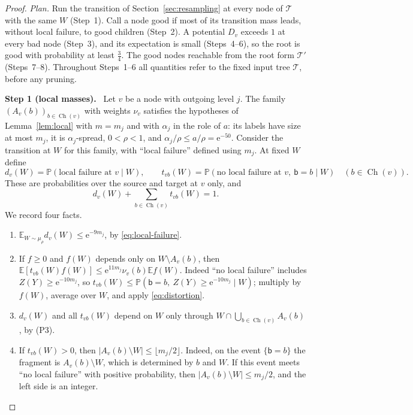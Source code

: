 \documentclass[11pt]{article}
\numberwithin{equation}{section}
\newcommand{\PP}{\mathbb P}
\newcommand{\EE}{\mathbb E}
\newcommand{\TT}{\mathcal T}
\newcommand{\ch}{\operatorname{Ch}}
\newcommand{\ee}{\mathrm e}
\newcommand{\tgt}{\mathsf b}
\newcommand{\step}[2]{\par\medskip\noindent\textbf{Step #1 (#2).}\ }
\begin{document}
\begin{proof}
\emph{Plan.} Run the transition of Section~\ref{sec:resampling} at every
node of $\TT$ with the same $W$ (Step~1). Call a node good if most of
its transition mass leads, without local failure, to good children
(Step~2). A potential $D_v$ exceeds $1$ at every bad node (Step~3), and
its expectation is small (Steps~4--6), so the root is good with
probability at least $\frac34$. The good nodes reachable from the root
form $\TT'$ (Steps~7--8). Throughout Steps~1--6 all quantities refer to
the fixed input tree $\TT$, before any pruning.

\step{1}{local masses}
Let $v$ be a node with outgoing level $j$. The family
$(A_v(b))_{b\in\ch(v)}$ with weights $\nu_v$ satisfies the hypotheses of
Lemma~\ref{lem:local} with $m=m_j$ and with $\alpha_j$ in the role of
$a$: its labels have size at most $m_j$, it is $\alpha_j$-spread,
$0<\rho<1$, and $\alpha_j/\rho\le a/\rho=\ee^{-50}$. Consider the
transition at $W$ for this family, with ``local failure'' defined using
$m_j$. At fixed $W$ define
\[
 d_v(W)=\PP(\text{local failure at }v\mid W),\qquad
 t_{vb}(W)=\PP(\text{no local failure at }v,\ \tgt=b\mid W)
 \quad(b\in\ch(v)).
\]
These are probabilities over the source and target at $v$ only, and
\begin{equation}\label{eq:local-masses}
 d_v(W)+\sum_{b\in\ch(v)}t_{vb}(W)=1.
\end{equation}
We record four facts.
\begin{enumerate}[label=(M\arabic*),leftmargin=2.8em,itemsep=2pt]
 \item $\EE_{W\sim\mu_\rho}d_v(W)\le\ee^{-9m_j}$, by
 \eqref{eq:local-failure}.
 \item If $f\ge0$ and $f(W)$ depends only on $W\setminus A_v(b)$, then
 $\EE[t_{vb}(W)f(W)]\le\ee^{11m_j}\nu_v(b)\EE f(W)$. Indeed ``no local
 failure'' includes $Z(Y)\ge\ee^{-10m_j}$, so
 $t_{vb}(W)\le\PP(\tgt=b,\ Z(Y)\ge\ee^{-10m_j}\mid W)$; multiply by
 $f(W)$, average over $W$, and apply \eqref{eq:distortion}.
 \item $d_v(W)$ and all $t_{vb}(W)$ depend on $W$ only through
 $W\cap\bigcup_{b\in\ch(v)}A_v(b)$, by (P3).
 \item If $t_{vb}(W)>0$, then
 $|A_v(b)\setminus W|\le\lfloor m_j/2\rfloor$. Indeed, on the event
 $\{\tgt=b\}$ the fragment is $A_v(b)\setminus W$, which is determined
 by $b$ and $W$. If this event meets ``no local failure'' with positive
 probability, then $|A_v(b)\setminus W|\le m_j/2$, and the left side is
 an integer.
\end{enumerate}


\end{proof}
\end{document}
